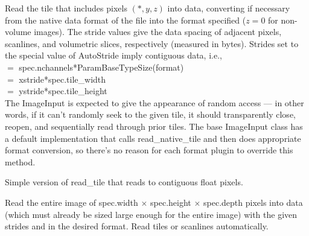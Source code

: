 Read the tile that includes pixels $(*,y,z)$ into {\kw data}, converting
if necessary from the native data format of the file into the 
{\kw format} specified ($z=0$ for non-volume images).  The stride values
give the data spacing of adjacent pixels, scanlines, and volumetric
slices, respectively (measured in bytes).  Strides set to the special
value of {\kw AutoStride} imply contiguous data, i.e., \\
 $=$ {\kw spec.nchannels*ParamBaseTypeSize(format)} \\
 $=$ {\kw xstride*spec.tile_width} \\
 $=$ {\kw ystride*spec.tile_height} \\
The {\kw ImageInput} is expected to give the appearance of random access
--- in other words, if it can't randomly seek to the given tile, it
should transparently close, reopen, and sequentially read through prior
tiles.  The base {\kw ImageInput} class has a default implementation
that calls read_native_tile and then does appropriate format conversion,
so there's no reason for each format plugin to override this method.
\apiend


Simple version of {\kw read_tile} that reads to contiguous float pixels.
\apiend


Read the entire image of {\kw spec.width} $\times$ {\kw spec.height}
$\times$ {\kw spec.depth}
pixels into data (which must already be sized large enough for
the entire image) with the given strides and in the desired
format.  Read tiles or scanlines automatically.  

